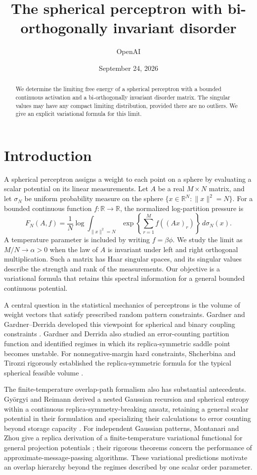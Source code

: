 \documentclass[11pt]{article}
\title{The spherical perceptron with bi-orthogonally invariant disorder}
\author{OpenAI}
\date{September 24, 2026}
\numberwithin{equation}{section}
\theoremstyle{definition}
\newcommand{\R}{\mathbb R}
\newcommand{\norm}[1]{\lVert #1\rVert}
\begin{document}
\maketitle
\begin{abstract}
We determine the limiting free energy of a spherical perceptron with a bounded
continuous activation and a bi-orthogonally invariant disorder matrix. The
singular values may have any compact limiting distribution, provided there are
no outliers. We give an explicit variational formula for this limit.
\end{abstract}

\section{Introduction}
A spherical perceptron assigns a weight to each point on a sphere by evaluating a scalar potential on its linear measurements. Let $A$ be a real $M\times N$ matrix, and let $\sigma_N$ be uniform probability measure on the sphere $\{x\in\R^N:\norm{x}^2=N\}$. For a bounded continuous function $f:\R\to\R$, the normalized log-partition pressure is
\begin{equation}\label{eq:original}
F_N(A,f)=\frac1N\log\int_{\norm{x}^2=N}
\exp\left\{\sum_{r=1}^M f((Ax)_r)\right\}\,d\sigma_N(x).
\end{equation}
A temperature parameter is included by writing $f=\beta\phi$. We study the limit as $M/N\to\alpha>0$ when the law of $A$ is invariant under left and right orthogonal multiplication. Such a matrix has Haar singular spaces, and its singular values describe the strength and rank of the measurements. Our objective is a variational formula that retains this spectral information for a general bounded continuous potential.

A central question in the statistical mechanics of perceptrons is the volume of weight vectors that satisfy prescribed random pattern constraints. Gardner and Gardner--Derrida developed this viewpoint for spherical and binary coupling constraints \cite{Gardner1988,GardnerDerrida1988}. Gardner and Derrida also studied an error-counting partition function and identified regimes in which its replica-symmetric saddle point becomes unstable. For nonnegative-margin hard constraints, Shcherbina and Tirozzi rigorously established the replica-symmetric formula for the typical spherical feasible volume \cite{ShcherbinaTirozzi2003}.

The finite-temperature overlap-path formalism also has substantial antecedents. Gy\"orgyi and Reimann derived a nested Gaussian recursion and spherical entropy within a continuous replica-symmetry-breaking ansatz, retaining a general scalar potential in their formulation and specializing their calculations to error counting beyond storage capacity \cite{GyorgyiReimann2000}. For independent Gaussian patterns, Montanari and Zhou give a replica derivation of a finite-temperature variational functional for general projection potentials \cite[Appendix~B]{MontanariZhou2024}; their rigorous theorems concern the performance of approximate-message-passing algorithms. These variational predictions motivate an overlap hierarchy beyond the regimes described by one scalar order parameter.
\end{document}
